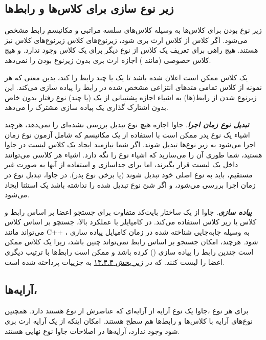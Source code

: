 \documentclass[a4paper,12pt]{report}
\newcommand{\lrm}[1]{\textcolor{steelBlue}{\lr{\texttt{#1}}}}
\begin{document}
	\subsection{
	زیر نوع سازی برای کلاس‌ها و رابط‌ها}
	زیر نوع بودن برای کلاس‌ها به وسیله کلاس‌های سلسه مراتبی و مکانیسم رابط مشخص می‌شود.
	اگر کلاس
	\lrm{A}
	از کلاس 
	\lrm{B}
	ارث بری شود، زیر‌نوع‌های کلاس 
	\lrm{A}
	زیرنوع‌های کلاس
	\lrm{B}
	نیز هستند. هیچ راهی‌ برای تعریف یک کلاس از نوع دیگر برای یک کلاس وجود ندارد.
	و هیچ کلاس خصوصی (مانند 
	)
	اجازه ارث بری بدون زیرنوع بودن را نمی‌دهد. 
	
	یک کلاس ممکن است اعلان شده باشد تا یک یا چند رابط را 
	 \lrm{implement}
	کند، بدین معنی که هر نمونه از کلاس تمامی متد‌های انتزاعی مشخص شده در رابط را پیاده سازی می‌کند.
	این زیرنوع شدن از رابط‌(ها) به اشیاء اجازه پشتیبانی از یک (یا چند) نوع رفتار بدون خاص بدون اشتارک گذاری یک پیاده سازی مشترک را می‌دهد.
	
	
	\textbf{\textit{
	تبدیل نوع زمان اجرا}}. جاوا اجازه هیچ نوع تبدیل بررسی نشده‌ای را نمی‌دهد، هرچند اشیاء یک نوع پدر ممکن است با استفاده از یک مکانیسم که شامل آزمون نوع زمان اجرا می‌شود به زیر نوع‌ها  تبدیل شوند. اگر شما نیازمند ایجاد یک کلاس لیست در جاوا هستید، شما طوری آن را می‌سازید که اشیاء نوع  
	\lrm{Object}
	را نگه دارد. اشیاء هر کلاسی می‌توانند داخل یک لیست قرار بگیرند، اما برای جداسازی و استفاده از آنها به صورت غیر مستقیم، باید به نوع اصلی خود تبدیل شوند (یا برخی نوع پدر). 
	در جاوا، تبدیل نوع در زمان اجرا بررسی می‌شود، و اگر شئ نوع تبدیل شده را نداشته باشد یک استثنا ایجاد می‌شود.
	
	\textbf{\textit{
		پیاده سازی}}. جاوا از یک ساختار بایت‌کد متفاوت برای جستجو اعضا بر اساس رابط و کلاس یا زیر کلاس استفاده می‌کند. در کامپایلر با عملکرد بالا، جستچو بر اساس کلاس می‌تواند مانند 
	C++
	، به وسیله جابه‌جایی
	 شناخته شده در زمان کامپایل پیاده سازی شود. هرچند، امکان جستجو بر اساس رابط نمی‌تواند چنین باشد، زیرا یک کلاس ممکن است چندین رابط را پیاده سازی 
	()
	کرده باشد و ممکن است رابط‌ها با ترتیب دیگری اعضا را لیست کنند. که در 
	\hyperref[subsec4:sec4:chap13]{
	زیر بخش ۱۳.۴.۴} به جزییات پرداخته شده است.
	
	\subsection{
	آرایه‌ها، }
	برای هر نوع 
	\lrm{T}
	،جاوا یک نوع آرایه 
	\lrm{T[]}
	از آرایه‌ای که عناصرش از نوع 
	\lrm{T}
	هستند دارد. همچنین نوع‌های آرایه با کلاس‌ها و رابط‌ها هم سطح هستند. 
	امکان اینکه از یک آرایه ارث بری شود وجود ندارد، آرایه‌ها در اصلاحات جاوا نوع نهایی هستند.
	
\end{document}
